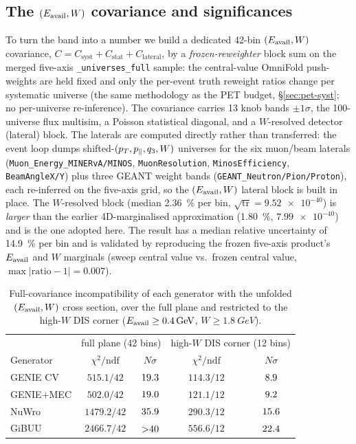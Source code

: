 \subsection{The $(E_{\mathrm{avail}},W)$ covariance and significances}
\label{sec:eavailw-cov}
To turn the band into a number we build a dedicated 42-bin $(E_{\mathrm{avail}},W)$
covariance, $C = C_{\mathrm{syst}}+C_{\mathrm{stat}}+C_{\mathrm{lateral}}$,
by a \emph{frozen-reweighter} block sum on the merged five-axis
\texttt{\_universes\_full} sample: the central-value OmniFold push-weights
are held fixed and only the per-event truth reweight ratios change per
systematic universe (the same methodology as the PET budget,
\S\ref{sec:pet-syst}; no per-universe re-inference). The covariance carries
13 knob bands $\pm1\sigma$, the 100-universe flux multisim, a Poisson
statistical diagonal, and a $W$-resolved detector (lateral) block. The
laterals are computed directly rather than transferred: the event loop dumps
shifted-$(p_{T},p_{\parallel},q_3,W)$ universes for the six muon/beam laterals
(\texttt{Muon\_Energy\_MINERvA/MINOS}, \texttt{MuonResolution},
\texttt{MinosEfficiency}, \texttt{BeamAngleX/Y}) plus three GEANT weight bands
(\texttt{GEANT\_Neutron/Pion/Proton}), each re-inferred on the five-axis grid,
so the $(E_{\mathrm{avail}},W)$ lateral block is built in place. The $W$-resolved block
(median \SI{2.36}{\percent} per bin, $\sqrt{\mathrm{tr}}=\num{9.52e-40}$) is
\emph{larger} than the earlier 4D-marginalised approximation
(\SI{1.80}{\percent}, $\num{7.99e-40}$) and is the one adopted here. The
result has a median relative uncertainty of \SI{14.9}{\percent} per bin and is
validated by reproducing the frozen five-axis product's $E_{\mathrm{avail}}$ and $W$
marginals (sweep central value vs.\ frozen central value,
$\max|\text{ratio}-1|=0.007$).

\begin{table}[H]
  \centering
  \begin{tabular}{@{}lcccc@{}}
    \toprule
    & \multicolumn{2}{c}{full plane (42 bins)} & \multicolumn{2}{c}{high-$W$ DIS corner (12 bins)} \\
    Generator & $\chi^{2}/\mathrm{ndf}$ & $N\sigma$ & $\chi^{2}/\mathrm{ndf}$ & $N\sigma$ \\
    \midrule
    GENIE CV     & $515.1/42$  & $19.3$ & $114.3/12$ & $8.9$ \\
    GENIE$+$MEC  & $502.0/42$  & $19.0$   & $121.1/12$ & $9.2$ \\
    NuWro        & $1479.2/42$ & $35.9$ & $290.3/12$ & $15.6$ \\
    GiBUU        & $2466.7/42$ & ${>}40$  & $556.6/12$ & $22.4$ \\
    \bottomrule
  \end{tabular}
  \caption{Full-covariance incompatibility of each generator with the
  unfolded $(E_{\mathrm{avail}},W)$ cross section, over the full plane and restricted to
  the high-$W$ DIS corner ($E_{\mathrm{avail}}\ge\SI{0.4}{GeV}$, $W\ge\SI{1.8}{GeV}$).}
  \label{tab:eavailW}
\end{table}

